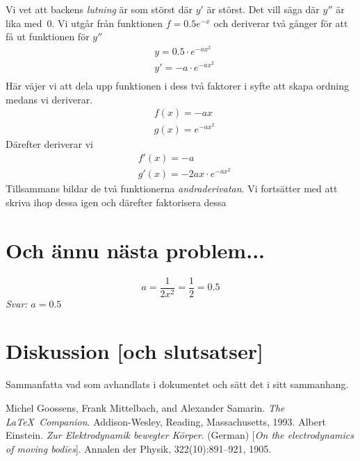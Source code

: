 \documentclass[a4paper,12pt]{article}
\begin{document}
Vi vet att backens \emph{lutning} är som störst 
där $y'$ är störst. Det vill säga där $y''$ är lika med~0. Vi utgår från 
funktionen $f=0.5e^{-x}$  och deriverar två gånger för att få ut funktionen 
för $y''$
%
\begin{align*}
  &y=0.5\cdot e^{-ax^2}\\
  &y'=-a\cdot e^{-ax^2}\\
\end{align*}
%
Här väjer vi att dela upp funktionen i dess två faktorer i syfte att skapa
ordning medans vi deriverar. 
\begin{align*}
  &f(x)=-ax\\
  &g(x)=e^{-ax^2}      
\end{align*}
Därefter deriverar vi
\begin{align*}
  &f'(x)=-a\\
  &g'(x)=-2ax\cdot e^{-ax^2}      
\end{align*}
Tillsammans bildar de två funktionerna \emph{andraderivatan}. Vi fortsätter
med att skriva ihop dessa igen och därefter faktorisera dessa
\section{Och ännu nästa problem...}
\label{sec:uppgN}



\begin{displaymath}
  a=\frac{1}{2x^2}=\frac{1}{2}=0.5
\end{displaymath}
\emph{Svar:} $a=0.5$
\section{Diskussion [och slutsatser]}
\label{sec:disk}


Sammanfatta vad som avhandlats i dokumentet och sätt det i
sitt sammanhang.
%
\begin{thebibliography}{99}
%
Michel Goossens, Frank Mittelbach, and Alexander Samarin. 
\textit{The \LaTeX\ Companion}. 
Addison-Wesley, Reading, Massachusetts, 1993.
%
Albert Einstein. 
\textit{Zur Elektrodynamik bewegter K{\"o}rper}. (German) 
[\textit{On the electrodynamics of moving bodies}]. 
Annalen der Physik, 322(10):891–921, 1905.
%
\end{thebibliography}
%
\end{document}

